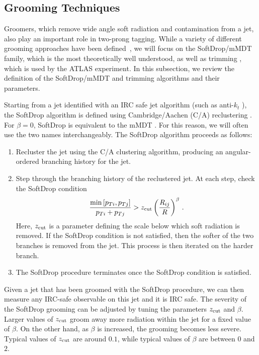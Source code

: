 \documentclass[11pt,letterpaper]{article}
\begin{document}
\subsection{Grooming Techniques}\label{jetsub_2prong_sec:groom_tech}

Groomers, which remove wide angle soft radiation and contamination from a jet, also play an important role in two-prong tagging.
%
While a variety of different grooming approaches have been defined~\cite{Butterworth:2008iy,Ellis:2009su,Ellis:2009me,Krohn:2009th,Dasgupta:2013via,Dasgupta:2013ihk}, we will focus on the SoftDrop/mMDT family, which is the most theoretically well understood, as well as trimming \cite{Krohn:2009th}, which is used by the ATLAS experiment.
%
In this subsection, we review the definition of the SoftDrop/mMDT and trimming algorithms and their parameters.

Starting from a jet identified with an IRC safe jet algorithm (such as
anti-$k_t$ \cite{Cacciari:2008gp}), the SoftDrop algorithm is defined
using Cambridge/Aachen (C/A) reclustering
\cite{Dokshitzer:1997in,Wobisch:1998wt,Wobisch:2000dk}.
%
For $\beta = 0$, SoftDrop is equivalent to the mMDT \cite{Dasgupta:2013ihk}. For this reason, we will often use the two names interchangeably.
%
The SoftDrop algorithm proceeds as follows:
%
\begin{enumerate}
%
\item Recluster the jet using the C/A clustering algorithm, producing an angular-ordered branching history for the jet.
%
\item Step through the branching history of the reclustered jet.  At each step, check the SoftDrop condition
\begin{align}\label{jetsub_2prong_eq:sd_cut}
\frac{\min\left[ p_{Ti}, p_{Tj}  \right]}{p_{Ti}+p_{Tj}}> {z_{\rm cut}} \left(   \frac{R_{ij}}{R}\right)^\beta \,.
\end{align}
Here, ${z_{\rm cut}}$ is a parameter defining the scale below which soft radiation is removed.  If the SoftDrop condition is not satisfied, then the softer of the two branches is removed from the jet.  This process is then iterated on the harder branch.
%
\item The SoftDrop procedure terminates once the SoftDrop condition is satisfied.
%
\end{enumerate}
%
Given a jet that has been groomed with the SoftDrop procedure, we can
then measure any IRC-safe observable on this jet and it is
IRC safe.
%
The severity of the SoftDrop grooming can be adjusted by
tuning the parameters ${z_{\rm cut}}$ and $\beta$.
%
Larger values of ${z_{\rm cut}}$ groom away more radiation within the jet for a fixed value of $\beta$.
%
On the other hand, as $\beta$ is increased, the grooming becomes less
severe.
%
Typical values of ${z_{\rm cut}}$ are around $0.1$, while typical
values of $\beta$ are between $0$ and $2$.
\end{document}

